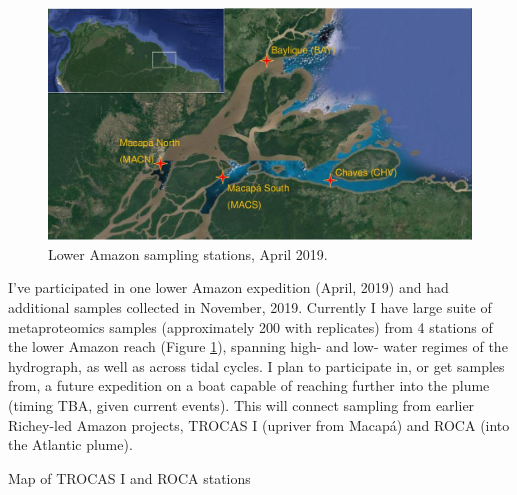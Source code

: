 \documentclass[12pt, letterpaper, twoside]{article}
\begin{document}
\begin{figure}
	\includegraphics[width=\linewidth]{amazon-sta-map.jpg}
	\caption{Lower Amazon sampling stations, April 2019. }
	\label{fig:amazon-stations}
\end{figure}

I've participated in one lower Amazon expedition (April, 2019) and had additional samples collected in November, 2019. Currently I have large suite of metaproteomics samples (approximately 200 with replicates) from 4 stations of the lower Amazon reach (Figure \ref{fig:amazon-stations}), spanning high- and low- water regimes of the hydrograph, as well as across tidal cycles. I plan to participate in, or get samples from, a future expedition on a boat capable of reaching further into the plume (timing TBA, given current events). This will connect sampling from earlier Richey-led Amazon projects, TROCAS I (upriver from Macap\'{a}) and ROCA (into the Atlantic plume).

\bigskip

Map of TROCAS I and ROCA stations

\bigskip
\end{document}
